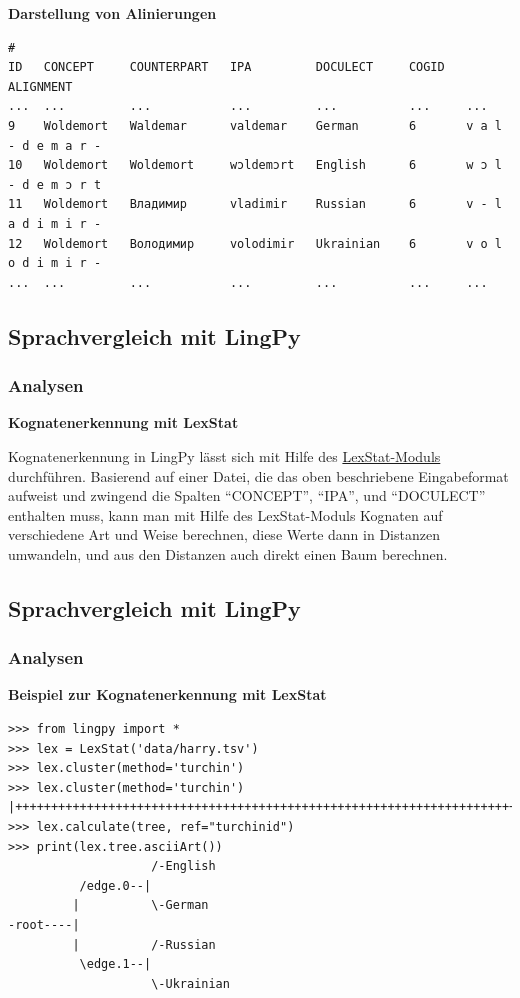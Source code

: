 \textbf{Darstellung von Alinierungen}

\begin{verbatim}
#
ID   CONCEPT     COUNTERPART   IPA         DOCULECT     COGID   ALIGNMENT  
...  ...         ...           ...         ...          ...     ...  
9    Woldemort   Waldemar      valdemar    German       6       v a l - d e m a r -
10   Woldemort   Woldemort     wɔldemɔrt   English      6       w ɔ l - d e m ɔ r t 
11   Woldemort   Владимир      vladimir    Russian      6       v - l a d i m i r -
12   Woldemort   Володимир     volodimir   Ukrainian    6       v o l o d i m i r -
...  ...         ...           ...         ...          ...     ...  
\end{verbatim}

\subsection{\texorpdfstring{{Sprachvergleich mit
LingPy}}{Sprachvergleich mit LingPy}}

\subsubsection{\texorpdfstring{{Analysen}}{Analysen}}

\textbf{Kognatenerkennung mit LexStat}

Kognatenerkennung in LingPy lässt sich mit Hilfe des
\href{http://lingpy.org/reference/lingpy.compare.html\#module-lingpy.compare.lexstat}{LexStat-Moduls}
durchführen. Basierend auf einer Datei, die das oben beschriebene
Eingabeformat aufweist und zwingend die Spalten ``CONCEPT'', ``IPA'',
und ``DOCULECT'' enthalten muss, kann man mit Hilfe des LexStat-Moduls
Kognaten auf verschiedene Art und Weise berechnen, diese Werte dann in
Distanzen umwandeln, und aus den Distanzen auch direkt einen Baum
berechnen.

\subsection{\texorpdfstring{{Sprachvergleich mit
LingPy}}{Sprachvergleich mit LingPy}}

\subsubsection{\texorpdfstring{{Analysen}}{Analysen}}

\textbf{Beispiel zur Kognatenerkennung mit LexStat}

\begin{verbatim}
>>> from lingpy import *
>>> lex = LexStat('data/harry.tsv')
>>> lex.cluster(method='turchin')
>>> lex.cluster(method='turchin')
|++++++++++++++++++++++++++++++++++++++++++++++++++++++++++++++++++++++++++++++++++++++++++++++++++++|
>>> lex.calculate(tree, ref="turchinid")
>>> print(lex.tree.asciiArt())
                    /-English
          /edge.0--|
         |          \-German
-root----|
         |          /-Russian
          \edge.1--|
                    \-Ukrainian
\end{verbatim}

